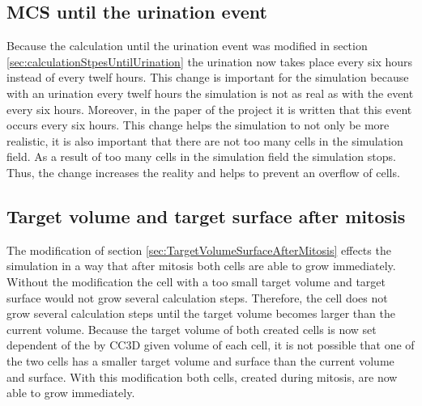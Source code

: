 \subsection{\ac{MCS} until the urination event}
Because the calculation until the urination event was modified in section \ref{sec:calculationStpesUntilUrination} the urination now takes place every six hours instead of every twelf hours. This change is important for the simulation because with an urination every twelf hours the simulation is not as real as with the event every six hours. Moreover, in the paper \cite{Torelli2017} of the project it is written that this event occurs every six hours. This change helps the simulation to not only be more realistic, it is also important that there are not too many cells in the simulation field. As a result of too many cells in the simulation field the simulation stops. Thus, the change increases the reality and helps to prevent an overflow of cells.
\subsection{Target volume and target surface after mitosis}
The modification of section \ref{sec:TargetVolumeSurfaceAfterMitosis} effects the simulation in a way that after mitosis both cells are able to grow immediately. Without the modification the cell with a too small target volume and target surface would not grow several calculation steps. Therefore, the cell does not grow several calculation steps until the target volume becomes larger than the current volume. Because the target volume of both created cells is now set dependent of the by \ac{CC3D} given volume of each cell, it is not possible that one of the two cells has a smaller target volume and surface than the current volume and surface. With this modification both cells, created during mitosis, are now able to grow immediately.
